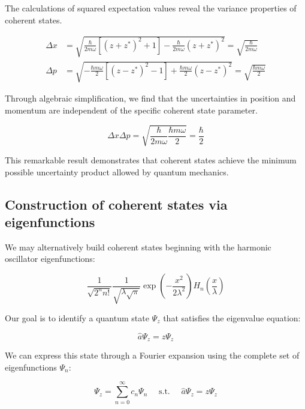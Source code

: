 \documentclass[italian]{HKNdocument}
\begin{document}
The calculations of squared expectation values reveal the variance properties of coherent states.

\begin{align}
\Delta x & =\sqrt{\frac{\hbar}{2 m \omega}\left[\left(z+z^{*}\right)^{2}+1\right]-\frac{\hbar}{2 m \omega}\left(z+z^{*}\right)^{2}}=\sqrt{\frac{\hbar}{2 m \omega}}  \label{eq:7.74}\\
\Delta p & =\sqrt{-\frac{\hbar m \omega}{2}\left[\left(z-z^{*}\right)^{2}-1\right]+\frac{\hbar m \omega}{2}\left(z-z^{*}\right)^{2}}=\sqrt{\frac{\hbar m \omega}{2}}
\end{align}

Through algebraic simplification, we find that the uncertainties in position and momentum are independent of the specific coherent state parameter.

\begin{equation}
\Delta x \Delta p=\sqrt{\frac{\hbar}{2 m \omega} \frac{\hbar m \omega}{2}}=\frac{\hbar}{2} \label{eq:7.75}
\end{equation}

This remarkable result demonstrates that coherent states achieve the minimum possible uncertainty product allowed by quantum mechanics.

\subsection{Construction of coherent states via eigenfunctions}
We may alternatively build coherent states beginning with the harmonic oscillator eigenfunctions:

\begin{equation}
\frac{1}{\sqrt{2^{n} n!}} \frac{1}{\sqrt{\lambda \sqrt{\pi}}} \exp \left(-\frac{x^{2}}{2 \lambda^{2}}\right) H_{n}\left(\frac{x}{\lambda}\right) \label{eq:7.76}
\end{equation}

Our goal is to identify a quantum state $\Psi_{z}$ that satisfies the eigenvalue equation:

\begin{equation}
\hat{a} \Psi_{z}=z \Psi_{z} \label{eq:7.77}
\end{equation}

We can express this state through a Fourier expansion using the complete set of eigenfunctions $\Psi_{n}$:

\begin{equation}
\Psi_{z}=\sum_{n=0}^{\infty} c_{n} \Psi_{n} \quad \text { s.t. } \quad \hat{a} \Psi_{z}=z \Psi_{z} \label{eq:7.78}
\end{equation}
\end{document}
